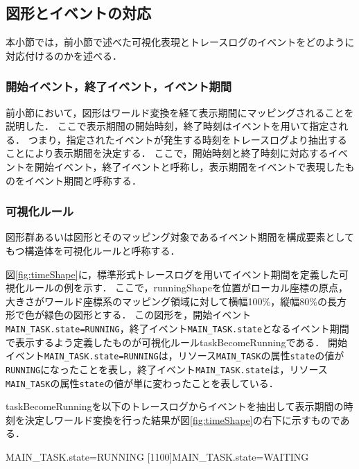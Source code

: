 \subsection{図形とイベントの対応}

本小節では，前小節で述べた可視化表現とトレースログのイベントをどのように対応付けるのかを述べる．

\subsubsection{開始イベント，終了イベント，イベント期間}
前小節において，図形はワールド変換を経て表示期間にマッピングされることを説明した．
ここで表示期間の開始時刻，終了時刻はイベントを用いて指定される．
つまり，指定されたイベントが発生する時刻をトレースログより抽出することにより表示期間を決定する．
ここで，開始時刻と終了時刻に対応するイベントを開始イベント，終了イベントと呼称し，表示期間をイベントで表現したものをイベント期間と呼称する．

\subsubsection{可視化ルール}
図形群あるいは図形とそのマッピング対象であるイベント期間を構成要素としてもつ構造体を可視化ルールと呼称する．

図\ref{fig:timeShape}に，標準形式トレースログを用いてイベント期間を定義した可視化ルールの例を示す．
ここで，runningShapeを位置がローカル座標の原点，大きさがワールド座標系のマッピング領域に対して横幅100\%，縦幅80\%の長方形で色が緑色の図形とする．
この図形を，開始イベント\verb|MAIN_TASK.state=RUNNING|，終了イベント\verb|MAIN_TASK.state|となるイベント期間で表示するよう定義したものが可視化ルールtaskBecomeRunningである．
開始イベント\verb|MAIN_TASK.state=RUNNING|は，リソース\verb|MAIN_TASK|の属性\verb|state|の値が\verb|RUNNING|になったことを表し，終了イベント\verb|MAIN_TASK.state|は，リソース\verb|MAIN_TASK|の属性\verb|state|の値が単に変わったことを表している．

taskBecomeRunningを以下のトレースログからイベントを抽出して表示期間の時刻を決定しワールド変換を行った結果が図\ref{fig:timeShape}の右下に示すものである．

\begin{EBNF}
[1000]MAIN_TASK.state=RUNNING
[1100]MAIN_TASK.state=WAITING
\end{EBNF}


